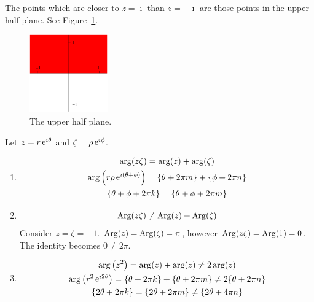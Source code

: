 {\begin{Solution}
\begin{enumerate}
    The points which are closer to $z = \imath$ than $z = - \imath$ are those points in 
    the upper half plane.  See Figure~\ref{upper-half-domain}.
    \begin{figure}[h!]
      \begin{center}
        \includegraphics[width=0.3\textwidth]{fcv/number/upper-half-domain}
      \end{center}
      \caption{The upper half plane.}
      \label{upper-half-domain}
    \end{figure}
  \end{enumerate}
\end{Solution}








\begin{Solution}
  \label{solution argument identities}
  Let $z = r \mathop{\mathrm{e}}\nolimits^{\imath \theta}$ and $\zeta = \rho \mathop{\mathrm{e}}\nolimits^{\imath \phi}$.
  \begin{enumerate}
  \item
    \begin{gather*}
      \arg(z \zeta) = \arg(z) + \arg(\zeta) \\
      \arg\left( r \rho \mathop{\mathrm{e}}\nolimits^{\imath (\theta + \phi)} \right) = \{ \theta + 2 \pi m \} + \{ \phi + 2 \pi n \} \\
      \{ \theta + \phi + 2 \pi k \} = \{ \theta + \phi + 2 \pi m \} 
    \end{gather*}
  \item
    \[
    \mathop{\mathrm{Arg}}\nolimits(z \zeta) \neq \mathop{\mathrm{Arg}}\nolimits(z) + \mathop{\mathrm{Arg}}\nolimits(\zeta)
    \]
    Consider $z = \zeta = -1$.  $\mathop{\mathrm{Arg}}\nolimits(z) = \mathop{\mathrm{Arg}}\nolimits(\zeta) = \pi$, however 
    $\mathop{\mathrm{Arg}}\nolimits(z \zeta) = \mathop{\mathrm{Arg}}\nolimits(1) = 0$.  The identity becomes $0 \neq 2 \pi$.
  \item
    \begin{gather*}
      \arg\left( z^2 \right) = \arg(z) + \arg(z) \neq 2 \arg(z) 
      \\
      \arg\left( r^2 \mathop{\mathrm{e}}\nolimits^{\imath 2 \theta} \right) 
      = \{ \theta + 2 \pi k \} + \{ \theta + 2 \pi m \} \neq 2 \{ \theta + 2 \pi n \} 
      \\
      \{ 2 \theta + 2 \pi k \} = \{ 2 \theta + 2 \pi m \} \neq \{ 2 \theta + 4 \pi n \} 
    \end{gather*}
  \end{enumerate}
\end{Solution}





}
